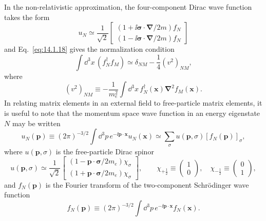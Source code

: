 In the non-relativistic approximation, the four-component Dirac wave function
takes the form
\begin{equation}
  u_N\simeq\frac1{\sqrt2}
  \begin{bmatrix}(1+\ii\boldsymbol\sigma\cdot\boldsymbol\nabla/2m)f_N\\
  (1-\ii\boldsymbol\sigma\cdot\boldsymbol\nabla/2m)f_N\end{bmatrix}
  \tag{14.1.37}\label{eq:14.1.37}
\end{equation}
and Eq.~\eqref{eq:14.1.18} gives the normalization condition
\begin{equation}
  \int \dd^3x\,(f_N^\dagger f_M)\simeq\delta_{NM}-\frac14(v^2)_{NM},
  \tag{14.1.38}\label{eq:14.1.38}
\end{equation}
where
\[
  (v^2)_{NM}\equiv-\frac1{m_e^2}\int \dd^3x\,
  f_N^\dagger(\mathbf x)\boldsymbol\nabla^2f_M(\mathbf x).
\]
In relating matrix elements in an external field to free-particle matrix
elements, it is useful to note that the momentum space wave function in an
energy eigenstate $N$ may be written
\begin{equation}
  u_N(\mathbf p)\equiv(2\pi)^{-3/2}\int \dd^3p\,
  e^{-\ii\mathbf p\cdot\mathbf x}u_N(\mathbf x)
  \simeq\sum_\sigma u(\mathbf p,\sigma)[f_N(\mathbf p)]_\sigma,
  \tag{14.1.39}\label{eq:14.1.39}
\end{equation}
where $u(\mathbf p,\sigma)$ is the free-particle Dirac spinor
\[
 u(\mathbf p,\sigma)\simeq\frac1{\sqrt2}
 \begin{bmatrix}(1-\mathbf p\cdot\boldsymbol\sigma/2m_e)\chi_\sigma\\
 (1+\mathbf p\cdot\boldsymbol\sigma/2m_e)\chi_\sigma\end{bmatrix},
 \qquad
 \chi_{+\frac12}\equiv\begin{pmatrix}1\\0\end{pmatrix},\quad
 \chi_{-\frac12}\equiv\begin{pmatrix}0\\1\end{pmatrix},
\]
and $f_N(\mathbf p)$ is the Fourier transform of the two-component
Schr\"odinger wave function
\[
  f_N(\mathbf p)\equiv(2\pi)^{-3/2}\int \dd^3p\,
  e^{-\ii\mathbf p\cdot\mathbf x}f_N(\mathbf x).
\]

